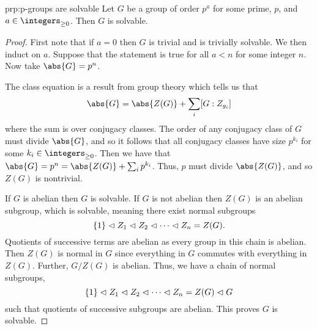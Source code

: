 \begin{prp}{}{prp:p-groups are solvable}
    Let \(G\) be a group of order \(p^a\) for some prime, \(p\), and \(a \in \integers_{\ge 0}\).
    Then \(G\) is solvable.
    \begin{proof}
        First note that if \(a = 0\) then \(G\) is trivial and is trivially solvable.
        We then induct on \(a\).
        Suppose that the statement is true for all \(a < n\) for some integer \(n\).
        Now take \(\abs{G} = p^n\).
        
        The class equation is a result from group theory which tells us that
        \begin{equation}
            \abs{G} = \abs{Z(G)} + \sum_i [G : Z_{g_i}]
        \end{equation}
        where the sum is over conjugacy classes.
        The order of any conjugacy class of \(G\) must divide \(\abs{G}\), and so it follows that all conjugacy classes have size \(p^{k_i}\) for some \(k_i \in \integers_{\ge 0}\).
        Then we have that \(\abs{G} = p^n = \abs{Z(G)} + \sum_i p^{k_i}\).
        Thus, \(p\) must divide \(\abs{Z(G)}\), and so \(Z(G)\) is nontrivial.
        
        If \(G\) is abelian then \(G\) is solvable.
        If \(G\) is not abelian then \(Z(G)\) is an abelian subgroup, which is solvable, meaning there exist normal subgroups
        \begin{equation}
            \{1\} \mathrel{\lhd} Z_1 \mathrel{\lhd} Z_2 \mathrel{\lhd} \dotsb \mathrel{\lhd} Z_n = Z(G).
        \end{equation}
        Quotients of successive terms are abelian as every group in this chain is abelian.
        Then \(Z(G)\) is normal in \(G\) since everything in \(G\) commutes with everything in \(Z(G)\).
        Further, \(G/Z(G)\) is abelian.
        Thus, we have a chain of normal subgroups,
        \begin{equation}
            \{1\} \mathrel{\lhd} Z_1 \mathrel{\lhd} Z_2 \mathrel{\lhd} \dotsb \mathrel{\lhd} Z_n = Z(G) \mathrel{\lhd} G
        \end{equation}
        such that quotients of successive subgroups are abelian.
        This proves \(G\) is solvable.
    \end{proof}
\end{prp}

